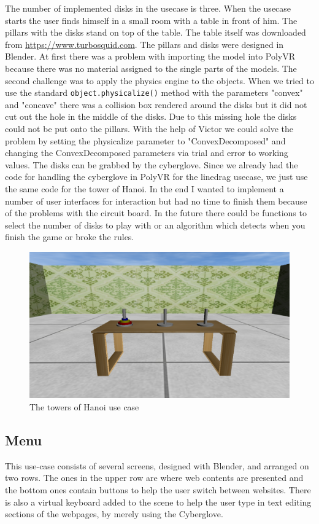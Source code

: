 The number of implemented disks in the usecase is three. When the usecase starts the user finds himself in a small room with a table in front of him. The pillars with the disks stand on top of the table. The table itself was downloaded from \url{https://www.turbosquid.com}. The pillars and disks were designed in Blender. At first there was a problem with importing the model into PolyVR because there was no material assigned to the single parts of the models. The second challenge was to apply the physics engine to the objects. When we tried to use the standard \texttt{object.physicalize()} method with the parameters "convex" and "concave" there was a collision box rendered around the disks but it did not cut out the hole in the middle of the disks. Due to this missing hole the disks could not be put onto the pillars. With the help of Victor we could solve the problem by setting the physicalize parameter to "ConvexDecomposed" and changing the ConvexDecomposed parameters via trial and error to working values. The disks can be grabbed by the cyberglove. Since we already had the code for handling the cyberglove in PolyVR for the linedrag usecase, we just use the same code for the tower of Hanoi. In the end I wanted to implement a number of user interfaces for interaction but had no time to finish them because of the problems with the circuit board. In the future there could be functions to select the number of disks to play with or an algorithm which detects when you finish the game or broke the rules. 

\begin{figure}[!h]
	\centering
	\includegraphics[width=\textwidth]{./images/hanoi2.png}
	\caption{The towers of Hanoi use case}
	\label{hanoi}
\end{figure}

\subsection{Menu}
This use-case consists of several screens, designed with Blender, and arranged on two rows. The ones in the upper row are where web contents are presented and the bottom ones contain buttons to help the user switch between websites. There is also a virtual keyboard added to the scene to help the user type in text editing sections of the webpages, by merely using the Cyberglove.

